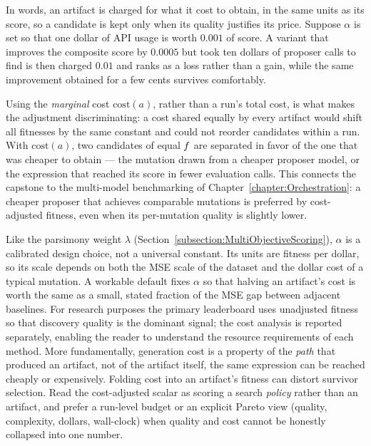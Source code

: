 In words, an artifact is charged for what it cost to obtain, in the same units as its score, so a candidate is kept only when its quality justifies its price.
Suppose $\alpha$ is set so that one dollar of API usage is worth $0.001$ of score.
A variant that improves the composite score by $0.0005$ but took ten dollars of proposer calls to find is then charged $0.01$ and ranks as a loss rather than a gain, while the same improvement obtained for a few cents survives comfortably.

Using the \emph{marginal} cost $\mathrm{cost}(a)$, rather than a run's total cost, is what makes the adjustment discriminating: a cost shared equally by every artifact would shift all fitnesses by the same constant and could not reorder candidates within a run.
With $\mathrm{cost}(a)$, two candidates of equal $f$ are separated in favor of the one that was cheaper to obtain — the mutation drawn from a cheaper proposer model, or the expression that reached its score in fewer evaluation calls.
This connects the capstone to the multi-model benchmarking of Chapter~\ref{chapter:Orchestration}: a cheaper proposer that achieves comparable mutations is preferred by cost-adjusted fitness, even when its per-mutation quality is slightly lower.

\begin{remark}
Like the parsimony weight $\lambda$ (Section~\ref{subsection:MultiObjectiveScoring}), $\alpha$ is a calibrated design choice, not a universal constant.
Its units are fitness per dollar, so its scale depends on both the MSE scale of the dataset and the dollar cost of a typical mutation.
A workable default fixes $\alpha$ so that halving an artifact's cost is worth the same as a small, stated fraction of the MSE gap between adjacent baselines.
For research purposes the primary leaderboard uses unadjusted fitness so that discovery quality is the dominant signal; the cost analysis is reported separately, enabling the reader to understand the resource requirements of each method.
More fundamentally, generation cost is a property of the \emph{path} that produced an artifact, not of the artifact itself, the same expression can be reached cheaply or expensively.
Folding cost into an artifact's fitness can distort survivor selection.
Read the cost-adjusted scalar as scoring a search \emph{policy} rather than an artifact, and prefer a run-level budget or an explicit Pareto view (quality, complexity, dollars, wall-clock) when quality and cost cannot be honestly collapsed into one number.
\end{remark}

